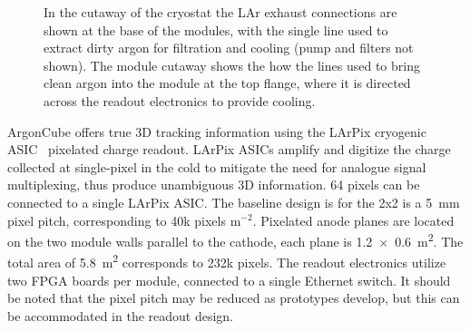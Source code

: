 \begin{figure}[tbp]
	\centering
	\caption[ArgonCube module cryogenic scheme]{In the cutaway of the cryostat the LAr exhaust connections are shown at the base of the modules, with the single line used to extract dirty argon for filtration and cooling (pump and filters not shown). The module cutaway shows the how the lines used to bring clean argon into the module at the top flange, where it is directed across the readout electronics to provide cooling.}
	\label{fig:cryo_scheme}
\end{figure}

ArgonCube offers true 3D tracking information using the LArPix cryogenic ASIC~\cite{larpix} pixelated charge readout. LArPix ASICs amplify and digitize the charge collected at single-pixel in the cold to mitigate the need for analogue signal multiplexing, thus produce unambiguous 3D information. 64 pixels can be connected to a single LArPix ASIC. The baseline design is for the 2x2 is a \SI{5}{\milli\metre} pixel pitch, corresponding to 40k pixels m$^{-2}$. Pixelated anode planes are located on the two module walls parallel to the cathode, each plane is \SI[product-units=repeat]{1.2x0.6}{\metre\squared}. The total area of \SI{5.8}{\metre\squared} corresponds to 232k pixels. The readout electronics utilize two FPGA boards per module, connected to a single Ethernet switch. It should be noted that the pixel pitch may be reduced as prototypes develop, but this can be accommodated in the readout design. 

